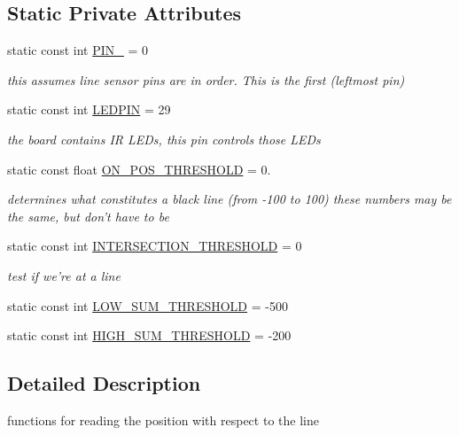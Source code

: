 \subsection*{Static Private Attributes}
\begin{DoxyCompactItemize}
\item 
static const int \hyperlink{classLineSensor_a873c5b45cdfa14ff468db018e1e0055a}{P\-I\-N\-\_} = 0
\begin{DoxyCompactList}\small\item\em this assumes line sensor pins are in order. This is the first (leftmost pin) \end{DoxyCompactList}\item 
static const int \hyperlink{classLineSensor_a09da44442cb9e026af2053b5d0b4f2ce}{L\-E\-D\-P\-I\-N} = 29
\begin{DoxyCompactList}\small\item\em the board contains I\-R L\-E\-Ds, this pin controls those L\-E\-Ds \end{DoxyCompactList}\item 
static const float \hyperlink{classLineSensor_a3e3c5f134159562e56fcd06e55cc7024}{O\-N\-\_\-\-P\-O\-S\-\_\-\-T\-H\-R\-E\-S\-H\-O\-L\-D} = 0.
\begin{DoxyCompactList}\small\item\em determines what constitutes a black line (from -\/100 to 100) these numbers may be the same, but don't have to be \end{DoxyCompactList}\item 
static const int \hyperlink{classLineSensor_a55b9f63bd4c01990f6f2d7baa830d2ec}{I\-N\-T\-E\-R\-S\-E\-C\-T\-I\-O\-N\-\_\-\-T\-H\-R\-E\-S\-H\-O\-L\-D} = 0
\begin{DoxyCompactList}\small\item\em test if we're at a line \end{DoxyCompactList}\item 
static const int \hyperlink{classLineSensor_a929091ad1746a0a337c2259ba79c959a}{L\-O\-W\-\_\-\-S\-U\-M\-\_\-\-T\-H\-R\-E\-S\-H\-O\-L\-D} = -\/500
\item 
static const int \hyperlink{classLineSensor_a3e7f65abc054f54cb74f8aa3eb552e89}{H\-I\-G\-H\-\_\-\-S\-U\-M\-\_\-\-T\-H\-R\-E\-S\-H\-O\-L\-D} = -\/200
\end{DoxyCompactItemize}


\subsection{Detailed Description}
functions for reading the position with respect to the line 

